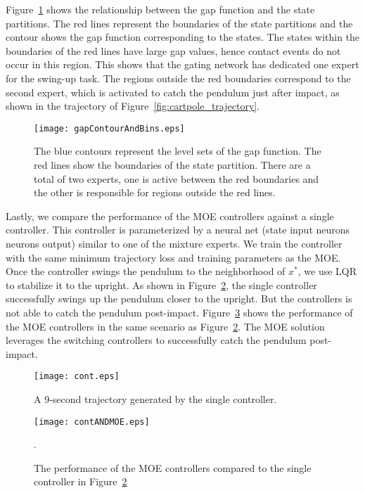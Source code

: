 Figure~\ref{fig:gapContour} shows the relationship between the gap function and the state partitions.
%
The red lines represent the boundaries of the state partitions and the contour
shows the gap function corresponding to the states.
%
The states within the boundaries of the red lines have large gap values, hence
contact events do not occur in this region.
%
This shows that the gating network has dedicated one expert for the swing-up
task.
%
The regions outside the red boundaries correspond to the second expert, which is
activated to catch the pendulum just after impact, as shown in the trajectory of
Figure~\ref{fig:cartpole_trajectory}.


\begin{figure}[H]
    \centering
    \texttt{[image: gapContourAndBins.eps]}
    \caption{The blue contours represent the level sets of the gap function. The red lines show the boundaries of the state partition. There are a total of two experts, one is active between the red boundaries and the other is responsible for regions outside the red lines.}
    \label{fig:gapContour}
\end{figure}


Lastly, we compare the performance of the MOE controllers against a single controller.
%
This controller is parameterized by a neural net (state input 
neurons  neurons  output) similar to one of the
mixture experts.
%
We train the controller with the same minimum trajectory loss and training
parameters as the MOE.
%
Once the controller swings the pendulum to the neighborhood of $x^*$, we use LQR
to stabilize it to the upright.
%
As shown in Figure~\ref{fig:continuous_control}, the single controller
successfully swings up the pendulum closer to the upright.
%
But the controllers is not able to catch the pendulum post-impact.
%
Figure~\ref{fig:contandmoe} shows the performance of the MOE controllers in the
same scenario as Figure~\ref{fig:continuous_control}.
%
The MOE solution leverages the switching controllers to successfully catch the
pendulum post-impact.
%

\begin{figure}[t]
    \centering
    \texttt{[image: cont.eps]}
    \caption{A 9-second trajectory generated by the single controller. }
    \label{fig:continuous_control}
\end{figure}

\begin{figure}[H]
    \centering
    \texttt{[image: contANDMOE.eps]}
    \caption{The performance of the MOE controllers compared to the single
    controller in Figure~\ref{fig:continuous_control}}.
    \label{fig:contandmoe}
\end{figure}
